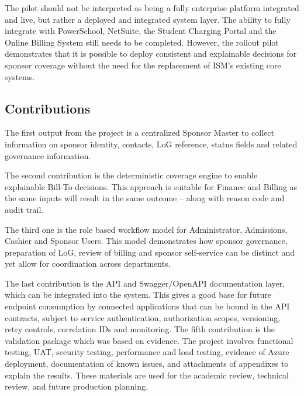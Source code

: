 The pilot should not be interpreted as being a fully enterprise platform integrated and live, but rather a deployed and integrated system layer. The ability to fully integrate with PowerSchool, NetSuite, the Student Charging Portal and the Online Billing System still needs to be completed. However, the rollout pilot demonstrates that it is possible to deploy consistent and explainable decisions for sponsor coverage without the need for the replacement of ISM's existing core systems.

\subsection{Contributions}

The first output from the project is a centralized Sponsor Master to collect information on sponsor identity, contacts, LoG reference, status fields and related governance information.

The second contribution is the deterministic coverage engine to enable explainable Bill-To decisions. This approach is suitable for Finance and Billing as the same inputs will result in the same outcome – along with reason code and audit trail.

The third one is the role based workflow model for Administrator, Admissions, Cashier and Sponsor Users. This model demonstrates how sponsor governance, preparation of LoG, review of billing and sponsor self-service can be distinct and yet allow for coordination across departments.

The last contribution is the API and Swagger/OpenAPI documentation layer, which can be integrated into the system. This gives a good base for future endpoint consumption by connected applications that can be bound in the API contracts, subject to service authentication, authorization scopes, versioning, retry controls, correlation IDs and monitoring. The fifth contribution is the validation package which was based on evidence. The project involves functional testing, UAT, security testing, performance and load testing, evidence of Azure deployment, documentation of known issues, and attachments of appendixes to explain the results. These materials are used for the academic review, technical review, and future production planning.